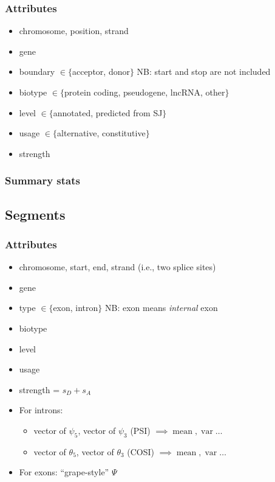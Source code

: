 \documentclass{article}
\DeclareMathOperator{\Var}{var}
\DeclareMathOperator{\mean}{mean}
\begin{document}
\subsubsection{Attributes}
\begin{itemize}
\item chromosome, position, strand
\item gene
\item boundary $\in\{$acceptor, donor$\}$ NB: start and stop are not included
\item biotype $\in\{$protein coding, pseudogene, lncRNA, other$\}$
\item level $\in\{$annotated, predicted from SJ$\}$
\item usage $\in\{$alternative, constitutive$\}$
\item {\color{blue} strength}
\end{itemize}

\subsubsection{Summary stats}


\clearpage

\subsection{Segments}
\subsubsection{Attributes}
\begin{itemize}
\item chromosome, start, end, strand (i.e., two splice sites)
\item gene
\item type $\in\{$exon, intron$\}$ NB: exon means {\em internal} exon
\item biotype 
\item level 
\item usage 
\item {\color{blue} strength = $s_D+s_A$}
\item For introns: 
\begin{itemize} 
\item {\color{red} vector of $\psi_5$, vector of $\psi_3$} (PSI) $\implies\mean,\Var\dots$ 
\item {\color{red} vector of $\theta_5$, vector of $\theta_3$} (COSI) $\implies\mean,\Var\dots$
\end{itemize}
\item For exons: {\color{red} ``grape-style'' $\Psi$} 
\end{itemize}
\end{document}
